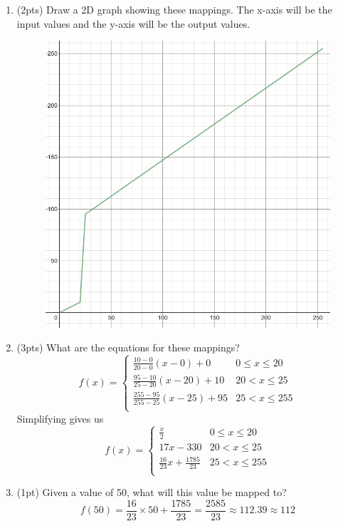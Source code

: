 \documentclass{article}
\begin{document}
\begin{enumerate}
\pagebreak
\begin{enumerate}
\item(2pts) Draw a 2D graph showing these mappings.  The x-axis will be the input values and the y-axis will be the output values.
\begin{figure}[h]
    \centering
    \includegraphics[scale=.5]{images/1-3-a.png}
\end{figure}


\item (3pts) What are the equations for these mappings?
$$ f(x) = \begin{cases}
    \frac{10-0}{20-0} (x-0) + 0         & 0 \leq x \leq 20 \\
    \frac{95-10}{25-20}(x-20) + 10      & 20 < x \leq 25 \\
    \frac{255-95}{255-25}(x-25) + 95    & 25 < x \leq 255 \\
 \end{cases} $$
Simplifying gives us
$$ f(x) = \begin{cases}
    \frac{x}{2}                         & 0 \leq x \leq 20  \\
    17x-330                             & 20 < x \leq 25    \\
    \frac{16}{23} x + \frac{1785}{23}   & 25 < x \leq 255   \\
 \end{cases} $$

\item (1pt) Given a value of 50, what will this value be mapped to?
$$f(50) = \frac{16}{23}\times 50 + \frac{1785}{23} = \frac{2585}{23} \approx 112.39 \approx 112 $$
\end{enumerate}
\end{enumerate}
\end{document}
